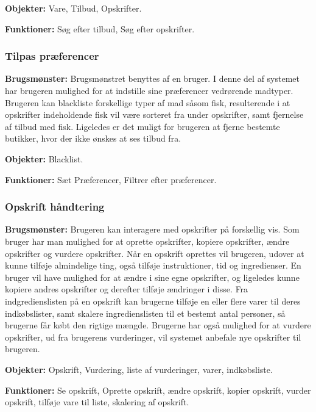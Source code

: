 \textbf{Objekter:} Vare, Tilbud, Opskrifter.

\textbf{Funktioner:} Søg efter tilbud, Søg efter opskrifter.

\subsubsection*{Tilpas præferencer}
\textbf{Brugsmønster:} Brugsmønstret benyttes af en bruger.
I denne del af systemet har brugeren mulighed for at indstille sine præferencer vedrørende madtyper.
Brugeren kan blackliste forskellige typer af mad såsom fisk, resulterende i at opskrifter indeholdende fisk vil være sorteret fra under opskrifter, samt fjernelse af tilbud med fisk.
Ligeledes er det muligt for brugeren at fjerne bestemte butikker, hvor der ikke ønskes at ses tilbud fra.

\textbf{Objekter:} Blacklist.

\textbf{Funktioner:} Sæt Præferencer, Filtrer efter præferencer.

\subsubsection*{Opskrift håndtering}
\textbf{Brugsmønster:}
Brugeren kan interagere med opskrifter på forskellig vis. 
Som bruger har man mulighed for at oprette opskrifter, kopiere opskrifter, ændre opskrifter og vurdere opskrifter.
Når en opskrift oprettes vil brugeren, udover at kunne tilføje almindelige ting, også tilføje instruktioner, tid og ingredienser.
En bruger vil have mulighed for at ændre i sine egne opskrifter, og ligeledes kunne kopiere andres opskrifter og derefter tilføje ændringer i disse.
Fra indgredienslisten på en opskrift kan brugerne tilføje en eller flere varer til deres indkøbslister, samt skalere ingredienslisten til et bestemt antal personer, så brugerne får købt den rigtige mængde.
Brugerne har også mulighed for at vurdere opskrifter, ud fra brugerens vurderinger, vil systemet anbefale nye opskrifter til brugeren.

\textbf{Objekter:} Opskrift, Vurdering, liste af vurderinger, varer, indkøbsliste.

\textbf{Funktioner:} Se opskrift, Oprette opskrift, ændre opskrift, kopier opskrift, vurder opskrift, tilføje vare til liste, skalering af opskrift.

%
%

